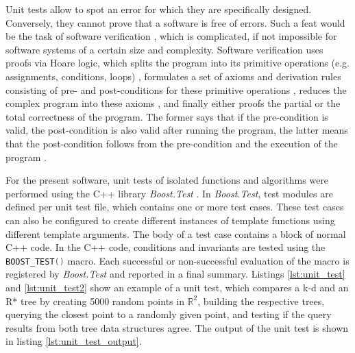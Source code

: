 Unit tests allow to spot an error for which they are specifically designed. Conversely, they cannot 
prove that a software is free of errors. Such a feat would be the task of software
verification \cite[Ch. 5, pp. 117-144]{Berghammer2017}, which is complicated, if not impossible for
software systems of a certain size and complexity.
Software verification uses proofs via Hoare logic, which splits the program into its primitive
operations (e.g. assignments, conditions, loops) \cite[pp. 118-119]{Berghammer2017}, formulates
a set of axioms and derivation rules consisting of pre- and post-conditions for these primitive operations
\cite[pp. 122]{Berghammer2017}, reduces the complex program into these axioms \cite[pp. 123]{Berghammer2017},
and finally either proofs the partial or the total correctness of the program.
The former says that if the pre-condition is valid, the post-condition is also valid after running the
program, the latter means that the post-condition follows from the pre-condition and the execution
of the program \cite[pp. 121]{Berghammer2017}.

For the present software, unit tests of isolated functions and algorithms were performed using the 
C++ library \textit{Boost.Test} \cite{web_boost_test}.
In \textit{Boost.Test}, test modules are defined per unit test file, which contains one or more test cases.
These test cases can also be configured to create different instances of template functions using
different template arguments. The body of a test case contains a block of normal C++ code.
In the C++ code, conditions and invariants are tested using the 
\lstinline[language=C++]|BOOST_TEST()| macro. Each successful or non-successful evaluation
of the macro is registered by \textit{Boost.Test} and reported in a final summary.
Listings \ref{lst:unit_test} and \ref{lst:unit_test2} show an example of a unit test, which compares
a k-d and an R* tree by creating 5000 random points in $\mathbb{R}^2$, building the respective
trees, querying the closest point to a randomly given point, and testing if the query results
from both tree data structures agree. The output of the unit test is shown in listing \ref{lst:unit_test_output}.

